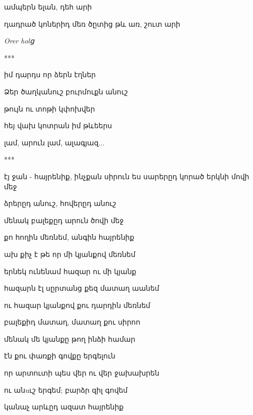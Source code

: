                          ամպերն ելան, դեհ արի


                         դադրած կոներիդ մեռ
                         ծըտից թև առ, շուտ  արի

                                        \it {Orer holց}

                                                   
                    
                    \centerline{***}


                      իմ դարդս որ ձերն էղներ


                    Ձեր ծաղկանուշ բուրմուքն անուշ

                     թույն ու տոթի կփոխվեր


                     հեյ վախ  կոտրան իմ թևեերս  


                    լամ, արուն լամ, ալագյազ...



                             \centerline{*** }  


                        էյ  ջան - հայրենիք,  ինչքան սիրուն ես
                        սարերըդ կորած երկնի մովի մեջ

                        ձրերըդ անուշ,  հովերըդ անուշ 

                        մենակ բալեքըդ արուն ծովի մեջ





                      քո հողին մեռնեմ, անգին հայրենիք

                      ախ քիչ է թե որ մի կյանքով մեռնեմ

                       երնեկ ունենամ   հազար ու մի կյանք


                       հազարն էլ սըրտանց  քեզ մատաղ աանեմ
                       





                              ու հազար կյանքով քու դարդին մեռնեմ


                             բալեքիդ մատաղ, մատաղ քու սիրոո



                      մենակ մե կյանքը թող ինձի համար


                           էն  քու  փառքի  գովքը երգելուն



                                   որ արտուտի պես  վեր ու վեր ջախախրեն

                                   ու անuւշ երգեմ; բարձր զիլ գովեմ


                                   կանաչ արևըդ   ազատ հայրենիք


  
